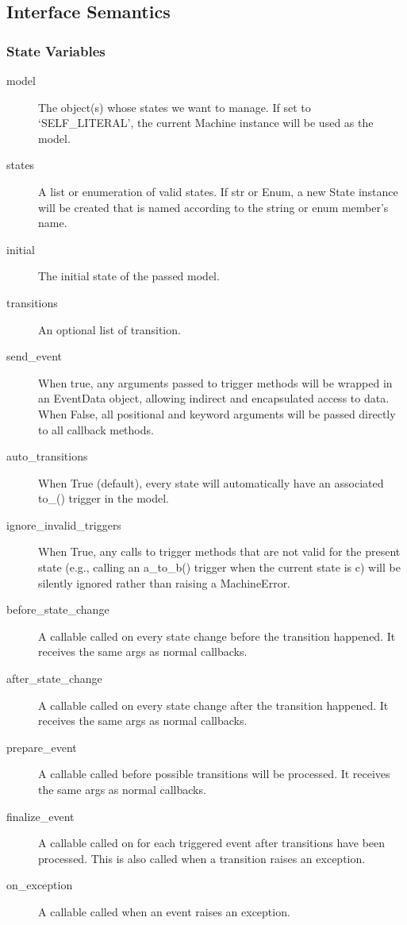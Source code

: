 \documentclass[12pt,titlepage]{article}
\begin{document}
\subsection{Interface Semantics}
\subsubsection{State Variables}
\begin{description}
\item[model] The object(s) whose states we want to manage. If set to
  `SELF\_LITERAL', the current Machine instance will be used as the model.
\item[states] A list or enumeration of valid states. If str or Enum, a new State
  instance will be created that is named according to the string or enum
  member's name.
\item[initial] The initial state of the passed model.
\item[transitions] An optional list of transition.
\item[send\_event] When true, any arguments passed to trigger methods will be
  wrapped in an EventData object, allowing indirect and encapsulated access to
  data. When False, all positional and keyword arguments will be passed directly
  to all callback methods.
\item[auto\_transitions] When True (default), every state will automatically have
  an associated to\_<state name>() trigger in the model.
\item[ignore\_invalid\_triggers] When True, any calls to trigger methods that are
  not valid for the present state (e.g., calling an a\_to\_b() trigger when the
  current state is c) will be silently ignored rather than raising a
  MachineError.
\item[before\_state\_change] A callable called on every state change before the
  transition happened. It receives the same args as normal callbacks.
\item[after\_state\_change] A callable called on every state change after the
  transition happened. It receives the same args as normal callbacks.
\item[prepare\_event] A callable called before possible transitions will be
  processed. It receives the same args as normal callbacks.
\item[finalize\_event] A callable called on for each triggered event after
  transitions have been processed. This is also called when a transition raises
  an exception.
\item[on\_exception] A callable called when an event raises an exception.
\end{description}
\end{document}

